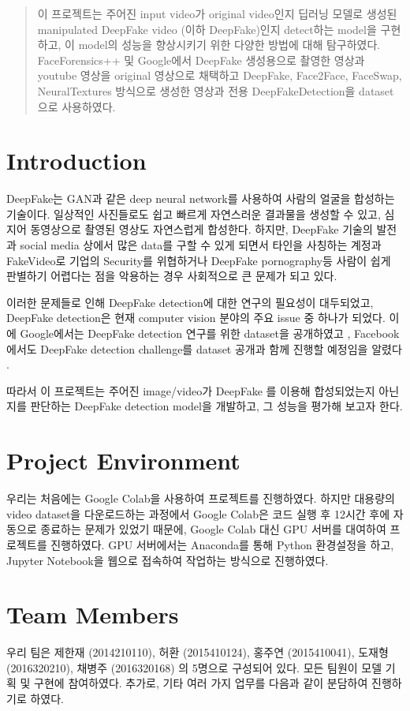 \documentclass{article}
\begin{document}
	\begin{abstract}
		이 프로젝트는 주어진 input video가 original video인지 딥러닝 모델로 생성된 manipulated DeepFake video (이하 DeepFake)인지 detect하는 model을 구현하고, 이 model의 성능을 향상시키기 위한 다양한 방법에 대해 탐구하였다. FaceForensics++ 및 Google에서 DeepFake 생성용으로 촬영한 영상과 youtube 영상을 original 영상으로 채택하고 DeepFake, Face2Face, FaceSwap, NeuralTextures 방식으로 생성한 영상과 전용 DeepFakeDetection을 dataset으로 사용하였다.
	\end{abstract}
	
	\section{Introduction}
	DeepFake는 GAN과 같은 deep neural network를 사용하여 사람의 얼굴을 합성하는 기술이다. 일상적인 사진들로도 쉽고 빠르게 자연스러운 결과물을 생성할 수 있고, 심지어 동영상으로 촬영된 영상도 자연스럽게 합성한다. 하지만, DeepFake 기술의 발전과 social media 상에서 많은 data를 구할 수 있게 되면서 타인을 사칭하는 계정과 FakeVideo로 기업의 Security를 위협하거나 DeepFake pornography등 사람이 쉽게 판별하기 어렵다는 점을 악용하는 경우 사회적으로 큰 문제가 되고 있다.
	
	이러한 문제들로 인해 DeepFake detection에 대한 연구의 필요성이 대두되었고, DeepFake detection은 현재 computer vision 분야의 주요 issue 중 하나가 되었다. 이에 Google에서는 DeepFake detection 연구를 위한 dataset을 공개하였고 \cite{googleblog}, Facebook에서도 DeepFake detection challenge를 dataset 공개과 함께 진행할 예정임을 알렸다 \cite{facebookblog}.
	
	따라서 이 프로젝트는 주어진 image/video가 DeepFake 를 이용해 합성되었는지 아닌지를 판단하는 DeepFake detection model을 개발하고, 그 성능을 평가해 보고자 한다.
	
	\section{Project Environment}
	
	우리는 처음에는 Google Colab을 사용하여 프로젝트를 진행하였다. 하지만 대용량의 video dataset을 다운로드하는 과정에서 Google Colab은 코드 실행 후 12시간 후에 자동으로 종료하는 문제가 있었기 때문에, Google Colab 대신 GPU 서버를 대여하여 프로젝트를 진행하였다. GPU 서버에서는 Anaconda를 통해 Python 환경설정을 하고, Jupyter Notebook을 웹으로 접속하여 작업하는 방식으로 진행하였다.
	
	\section{Team Members}
	우리 팀은 제한재 (2014210110), 허환 (2015410124), 홍주연 (2015410041), 도재형 (2016320210), 채병주 (2016320168) 의 5명으로 구성되어 있다.
	모든 팀원이 모델 기획 및 구현에 참여하였다. 추가로, 기타 여러 가지 업무를 다음과 같이 분담하여 진행하기로 하였다.
	
\end{document}
